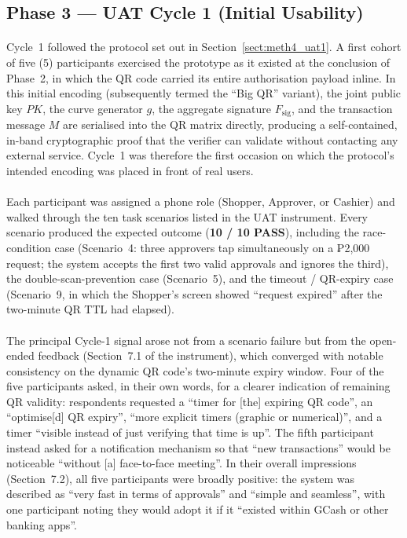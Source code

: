 \subsection{Phase 3 --- UAT Cycle 1 (Initial Usability)}
\label{sect:results_uat1}

\paragraph{}Cycle~1 followed the protocol set out in Section~\ref{sect:meth4_uat1}. A first cohort of five (5) participants exercised the prototype as it existed at the conclusion of Phase~2, in which the QR code carried its entire authorisation payload inline. In this initial encoding (subsequently termed the ``Big QR'' variant), the joint public key $PK$, the curve generator $g$, the aggregate signature $F_{\text{sig}}$, and the transaction message $M$ are serialised into the QR matrix directly, producing a self-contained, in-band cryptographic proof that the verifier can validate without contacting any external service. Cycle~1 was therefore the first occasion on which the protocol's intended encoding was placed in front of real users.

\paragraph{}Each participant was assigned a phone role (Shopper, Approver, or Cashier) and walked through the ten task scenarios listed in the UAT instrument. Every scenario produced the expected outcome (\textbf{10 / 10 PASS}), including the race-condition case (Scenario~4: three approvers tap simultaneously on a ₱2{,}000 request; the system accepts the first two valid approvals and ignores the third), the double-scan-prevention case (Scenario~5), and the timeout / QR-expiry case (Scenario~9, in which the Shopper's screen showed ``request expired'' after the two-minute QR TTL had elapsed).

\paragraph{}The principal Cycle-1 signal arose not from a scenario failure but from the open-ended feedback (Section~7.1 of the instrument), which converged with notable consistency on the dynamic QR code's two-minute expiry window. Four of the five participants asked, in their own words, for a clearer indication of remaining QR validity: respondents requested a ``timer for [the] expiring QR code'', an ``optimise[d] QR expiry'', ``more explicit timers (graphic or numerical)'', and a timer ``visible instead of just verifying that time is up''. The fifth participant instead asked for a notification mechanism so that ``new transactions'' would be noticeable ``without [a] face-to-face meeting''. In their overall impressions (Section~7.2), all five participants were broadly positive: the system was described as ``very fast in terms of approvals'' and ``simple and seamless'', with one participant noting they would adopt it if it ``existed within GCash or other banking apps''.

